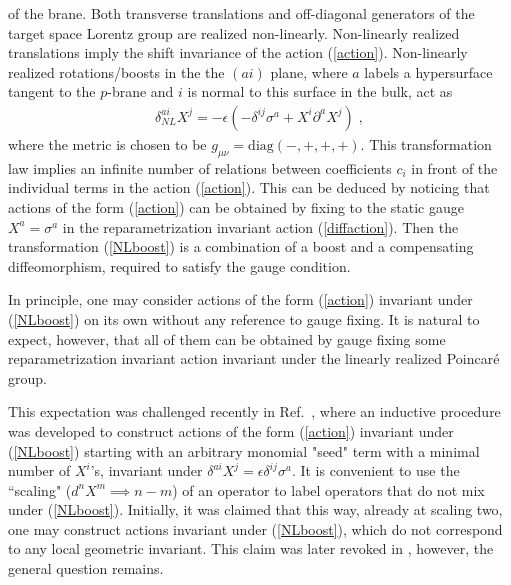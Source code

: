 \documentclass[%
 reprint,
 amsmath,amssymb,
 aps,
]{revtex4-1}
\begin{document}
of the brane. Both transverse translations and off-diagonal generators of the target space
Lorentz group are realized non-linearly. Non-linearly realized translations imply the shift invariance of the action (\ref{action}).
 Non-linearly realized rotations/boosts in the
the $(ai)$ plane, where $a$ labels a hypersurface tangent to the $p$-brane and $i$ is normal to
this surface in the bulk, act as
\begin{eqnarray}
\label{NLboost}
    \delta^{a i}_{NL} X^j =- \epsilon (-\delta^{ij}
    \sigma^a + X^i \partial^a X^{j}) \; ,
\end{eqnarray}
where the metric is chosen to be $g_{\mu \nu} = \mathrm{diag}(-,+,+,+)$. This transformation law implies an infinite number of relations between
coefficients $c_i$ in front of the individual terms in the action (\ref{action}). This can be deduced by  noticing that actions
of the form (\ref{action}) can be obtained by fixing to the static gauge $X^a=\sigma^a$ in the reparametrization invariant action
(\ref{diffaction}). Then the transformation (\ref{NLboost}) is a combination of a boost and a compensating
diffeomorphism, required to satisfy the gauge condition.

In principle, one may consider actions of the form (\ref{action}) invariant under (\ref{NLboost}) on its own  without any reference to  gauge fixing.
It is natural to expect, however, that all of them can be obtained by gauge fixing some reparametrization invariant action
invariant under the linearly realized Poincar\'e group.

This expectation was challenged recently in Ref.~\cite{Gliozzi:2012cx}, where an inductive procedure was developed
to construct actions of the form (\ref{action}) invariant under (\ref{NLboost}) starting with an arbitrary monomial "seed" term with a minimal number of $X^i$'s, invariant under
$\delta^{ai}X^j=\epsilon \delta^{ij}  \sigma^a $. It is convenient to use the ``scaling" ($d^n X^m \implies n-m$)
of an operator to label operators that do not mix under (\ref{NLboost}).
Initially, it was claimed that this way, already at scaling two, one may construct actions invariant under   (\ref{NLboost}), which do not correspond
to any local geometric invariant. This claim was later revoked in \cite{Meineri:2013ew}, however, the general question remains.
\end{document}
